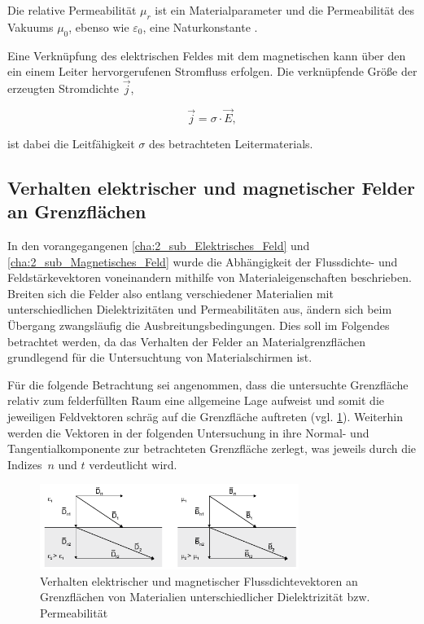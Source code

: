 Die relative Permeabilität $\mu_r$ ist ein Materialparameter und die Permeabilität des Vakuums $\mu_0$, ebenso wie $\varepsilon_0$, eine Naturkonstante \cite{EM_Schirmung}.
\par
\vspace{\linespace}
Eine Verknüpfung des elektrischen Feldes mit dem magnetischen kann über den ein einem Leiter hervorgerufenen Stromfluss erfolgen. Die verknüpfende Größe der erzeugten Stromdichte $\vec j$,

\begin{equation}
    \vec j = \sigma \cdot \vec E,
\end{equation}

ist dabei die Leitfähigkeit $\sigma$ des betrachteten Leitermaterials.


\subsection{Verhalten elektrischer und magnetischer Felder an Grenzflächen}

In den vorangegangenen \Abschnitten \ref{cha:2_sub_Elektrisches_Feld} und \ref{cha:2_sub_Magnetisches_Feld} wurde die Abhängigkeit der Flussdichte- und Feldstärkevektoren voneinandern mithilfe von Materialeigenschaften beschrieben. Breiten sich die Felder also entlang verschiedener Materialien mit unterschiedlichen Dielektrizitäten und Permeabilitäten aus, ändern sich beim Übergang zwangsläufig die Ausbreitungsbedingungen. Dies soll im Folgendes betrachtet werden, da das Verhalten der Felder an Materialgrenzflächen grundlegend für die Untersuchtung von Materialschirmen ist. 
\par
\vspace{\linespace}
Für die folgende Betrachtung sei angenommen, dass die untersuchte Grenzfläche relativ zum felderfüllten Raum eine allgemeine Lage aufweist und somit die jeweiligen Feldvektoren schräg auf die Grenzfläche auftreten (vgl. \Abb \ref{fig:2_Flussdichten_an_Grenzflaechen}). Weiterhin werden die Vektoren in der folgenden Untersuchung in ihre Normal- und Tangentialkomponente zur betrachteten Grenzfläche zerlegt, was jeweils durch die Indizes~$n$ und $t$ verdeutlicht wird. 

\begin{figure}[ht]
    \centering
    \includegraphics[width=0.75\textwidth]{Abbildungen/Kapitel2/Flussdichten_an_Grenzflaechen.png}
    \caption{Verhalten elektrischer und magnetischer Flussdichtevektoren an Grenzflächen von \mbox{Materialien} unterschiedlicher Dielektrizität bzw. Permeabilität}
    \label{fig:2_Flussdichten_an_Grenzflaechen}
\end{figure}

